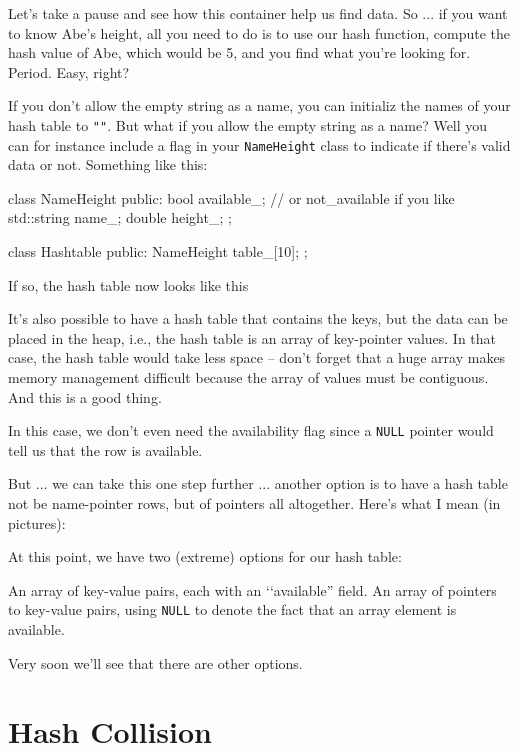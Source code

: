 

Let's take a pause and see how 
this container help us find data.
So ... if you want to know Abe's height,
all you need to do is to use our hash function, 
compute the hash value of Abe, which would be 5,
and you find what you're looking for.
Period.
Easy, right?

If you don't allow the empty string as a name,
you can initializ the names of your 
hash table to \verb!""!.
But what if you allow the empty string
as a name?
Well you can for instance include a flag in your
\verb!NameHeight! class to indicate if there's valid data or not.
Something like this:
{\small
\begin{console}
class NameHeight
{
public:
    bool available_; // or not_available if you like
    std::string name_;
    double height_;
};

class Hashtable
{
public:
    NameHeight table_[10];
};
\end{console}
}
If so, the hash table now looks like this




It's also possible to have a hash table that contains
the keys, but the 
data can be placed in the heap, i.e.,
the hash table is an array of key-pointer values.
In that case, the hash table would take less space --
don't forget that a huge array makes memory management
difficult because the array of values must be contiguous.
And this is a good thing.


In this case, we don't even need the availability flag since a
\verb!NULL! pointer would tell us that the row is available.

But ... we can take this one step further ...
another option is to have a hash table not be 
name-pointer rows,
but of pointers all altogether.
Here's what I mean (in pictures):



At this point, we have two (extreme) options for our hash table:
\begin{tightlist}
\li An array of key-value pairs, each with an \lq\lq available''
    field.
\li An array of pointers to key-value pairs, using \verb!NULL!
    to denote the fact that an array element is available.
\end{tightlist} 

Very soon we'll see that there are other options.




\newpage
\section{Hash Collision}

